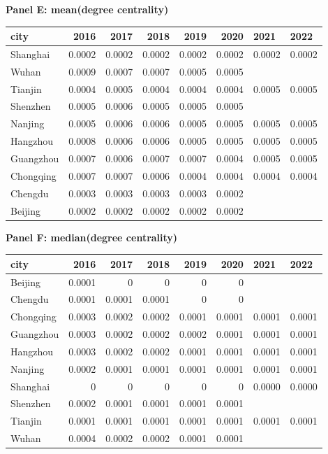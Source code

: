 \textbf{Panel E: mean(degree centrality)}\\
\begin{tabular}{lrrrrrll}
\hline
 city      &   2016 &   2017 &   2018 &   2019 &   2020 & 2021   & 2022   \\
\hline
 Shanghai  & 0.0002 & 0.0002 & 0.0002 & 0.0002 & 0.0002 & 0.0002 & 0.0002 \\
 Wuhan     & 0.0009 & 0.0007 & 0.0007 & 0.0005 & 0.0005 &        &        \\
 Tianjin   & 0.0004 & 0.0005 & 0.0004 & 0.0004 & 0.0004 & 0.0005 & 0.0005 \\
 Shenzhen  & 0.0005 & 0.0006 & 0.0005 & 0.0005 & 0.0005 &        &        \\
 Nanjing   & 0.0005 & 0.0006 & 0.0006 & 0.0005 & 0.0005 & 0.0005 & 0.0005 \\
 Hangzhou  & 0.0008 & 0.0006 & 0.0006 & 0.0005 & 0.0005 & 0.0005 & 0.0005 \\
 Guangzhou & 0.0007 & 0.0006 & 0.0007 & 0.0007 & 0.0004 & 0.0005 & 0.0005 \\
 Chongqing & 0.0007 & 0.0007 & 0.0006 & 0.0004 & 0.0004 & 0.0004 & 0.0004 \\
 Chengdu   & 0.0003 & 0.0003 & 0.0003 & 0.0003 & 0.0002 &        &        \\
 Beijing   & 0.0002 & 0.0002 & 0.0002 & 0.0002 & 0.0002 &        &        \\
\hline
\end{tabular}

\textbf{Panel F: median(degree centrality)}\\
\begin{tabular}{lrrrrrll}
\hline
 city      &   2016 &   2017 &   2018 &   2019 &   2020 & 2021   & 2022   \\
\hline
 Beijing   & 0.0001 & 0      & 0      & 0      & 0      &        &        \\
 Chengdu   & 0.0001 & 0.0001 & 0.0001 & 0      & 0      &        &        \\
 Chongqing & 0.0003 & 0.0002 & 0.0002 & 0.0001 & 0.0001 & 0.0001 & 0.0001 \\
 Guangzhou & 0.0003 & 0.0002 & 0.0002 & 0.0002 & 0.0001 & 0.0001 & 0.0001 \\
 Hangzhou  & 0.0003 & 0.0002 & 0.0002 & 0.0001 & 0.0001 & 0.0001 & 0.0001 \\
 Nanjing   & 0.0002 & 0.0001 & 0.0001 & 0.0001 & 0.0001 & 0.0001 & 0.0001 \\
 Shanghai  & 0      & 0      & 0      & 0      & 0      & 0.0000 & 0.0000 \\
 Shenzhen  & 0.0002 & 0.0001 & 0.0001 & 0.0001 & 0.0001 &        &        \\
 Tianjin   & 0.0001 & 0.0001 & 0.0001 & 0.0001 & 0.0001 & 0.0001 & 0.0001 \\
 Wuhan     & 0.0004 & 0.0002 & 0.0002 & 0.0001 & 0.0001 &        &        \\
\hline
\end{tabular}

